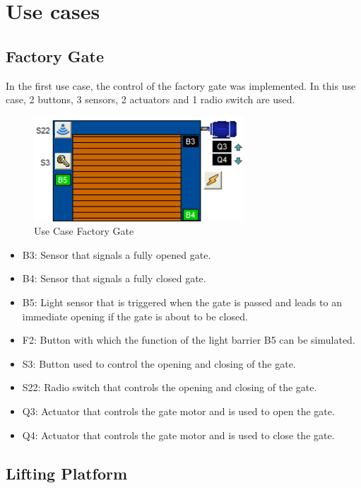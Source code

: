 \chapter{Use cases}

\section{Factory Gate}

In the first use case, the control of the factory gate was implemented. In this use case, 2 buttons, 3 sensors, 2 actuators and 1 radio switch are used.

\begin{figure}[h]
    \centering
    \includegraphics[width=0.70\textwidth]{images/usecase_factory_gate.png}
    \caption{Use Case Factory Gate}
    \label{fig:UseCaseFactoryGate}
\end{figure}

\begin{itemize}
    \item B3: Sensor that signals a fully opened gate.
    \item B4: Sensor that signals a fully closed gate.
    \item B5: Light sensor that is triggered when the gate is passed and leads to an immediate opening if the gate is about to be closed.    
    \item F2: Button with which the function of the light barrier B5 can be simulated.
    \item S3: Button used to control the opening and closing of the gate.
    \item S22: Radio switch that controls the opening and closing of the gate.
    \item Q3: Actuator that controls the gate motor and is used to open the gate.
    \item Q4: Actuator that controls the gate motor and is used to close the gate.
\end{itemize}

\section{Lifting Platform}

